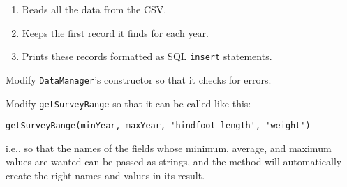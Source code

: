 \begin{enumerate}
\item
  Reads all the data from the CSV.
\item
  Keeps the first record it finds for each year.
\item
  Prints these records formatted as SQL \texttt{insert} statements.
\end{enumerate}


Modify \texttt{DataManager}'s constructor so that it checks for errors.


Modify \texttt{getSurveyRange} so that it can be called like this:

\begin{verbatim}
getSurveyRange(minYear, maxYear, 'hindfoot_length', 'weight')
\end{verbatim}

\noindent
i.e., so that the names of the fields whose minimum, average, and maximum values are wanted
can be passed as strings,
and the method will automatically create the right names and values in its result.



